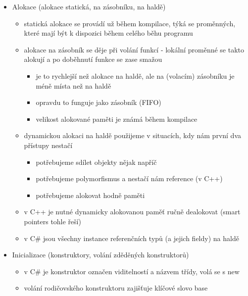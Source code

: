 \begin{itemize}
\begin{itemize}
\begin{itemize}
\item zachycují/zpracovávají se pomocí try-catch-finally bloku
\item catch bloků může být víc pro různé typy výjimek
\item v catch bloku můžeme tu stejnou výjimku vyhodit znova pomocí \texttt{throw;\allowbreak{}}
\end{itemize}
\end{itemize}
\item Alokace (alokace statická, na zásobníku, na haldě)
\begin{itemize}
\item statická alokace se provádí už během kompilace, týká se proměnných, které mají být k dispozici během celého běhu programu
\item alokace na zásobník se děje při volání funkcí - lokální proměnné se takto alokují a po doběhnutí funkce se zase smažou
\begin{itemize}
\item je to rychlejší než alokace na haldě, ale na (volacím) zásobníku je méně místa než na haldě
\item opravdu to funguje jako zásobník (FIFO)
\item velikost alokované paměti je známá během kompilace
\end{itemize}
\item dynamickou alokaci na haldě použijeme v situacích, kdy nám první dva přístupy nestačí
\begin{itemize}
\item potřebujeme sdílet objekty nějak napříč
\item potřebujeme polymorfismus a nestačí nám reference (v C++)
\item potřebujeme alokovat hodně paměti
\end{itemize}
\item v C++ je nutné dynamicky alokovanou paměť ručně dealokovat (smart pointers tohle řeší)
\item v C\# jsou všechny instance referenčních typů (a jejich fieldy) na haldě
\end{itemize}
\item Inicializace (konstruktory, volání zděděných konstruktorů)
\begin{itemize}
\item v C\# je konstruktor označen viditelností a názvem třídy, volá se s new
\item volání rodičovského konstruktoru zajišťuje klíčové slovo base
\begin{itemize}

\end{itemize}
\end{itemize}
\end{itemize}
